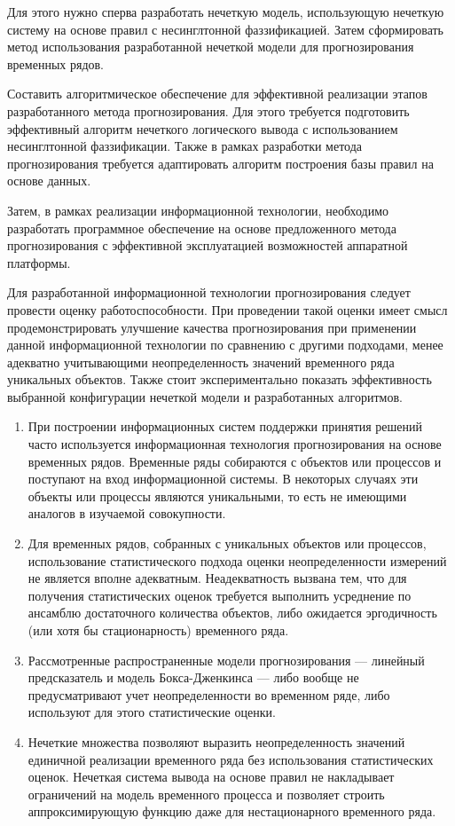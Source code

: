 Для этого нужно сперва разработать нечеткую модель, использующую нечеткую систему на основе правил с несинглтонной фаззификацией. Затем сформировать метод использования разработанной нечеткой модели для прогнозирования временных рядов.

Составить алгоритмическое обеспечение для эффективной реализации этапов разработанного метода прогнозирования. Для этого требуется подготовить эффективный алгоритм нечеткого логического вывода с использованием несинглтонной фаззификации. Также в рамках разработки метода прогнозирования требуется адаптировать алгоритм построения базы правил на основе данных.

Затем, в рамках реализации информационной технологии, необходимо разработать программное обеспечение на основе предложенного метода прогнозирования с эффективной эксплуатацией возможностей аппаратной платформы.

Для разработанной информационной технологии прогнозирования следует провести оценку работоспособности. При проведении такой оценки имеет смысл продемонстрировать улучшение качества прогнозирования при применении данной информационной технологии по сравнению с другими подходами, менее адекватно учитывающими неопределенность значений временного ряда уникальных объектов. Также стоит экспериментально показать эффективность выбранной конфигурации нечеткой модели и разработанных алгоритмов.


\begin{enumerate}
	\item При построении информационных систем поддержки принятия решений часто используется информационная технология прогнозирования на основе временных рядов. Временные ряды собираются с объектов или процессов и поступают на вход информационной системы. В некоторых случаях эти объекты или процессы являются уникальными, то есть не имеющими аналогов в изучаемой совокупности.
	\item Для временных рядов, собранных с уникальных объектов или процессов, использование статистического подхода оценки неопределенности измерений не является вполне адекватным. Неадекватность вызвана тем, что для получения статистических оценок требуется выполнить усреднение по ансамблю достаточного количества объектов, либо ожидается эргодичность (или хотя бы стационарность) временного ряда.
	\item Рассмотренные распространенные модели прогнозирования --- линейный предсказатель и модель Бокса-Дженкинса --- либо вообще не предусматривают учет неопределенности во временном ряде, либо используют для этого статистические оценки.
	\item Нечеткие множества позволяют выразить неопределенность значений единичной реализации временного ряда без использования статистических оценок. Нечеткая система вывода на основе правил не накладывает ограничений на модель временного процесса и позволяет строить аппроксимирующую функцию даже для нестационарного временного ряда.
\end{enumerate}

